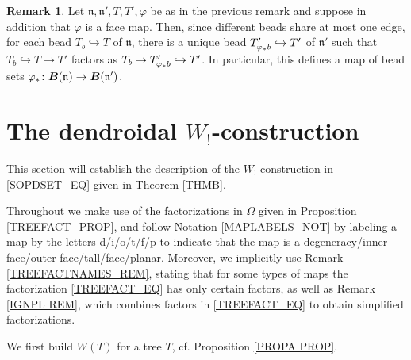 \documentclass[a4paper,10pt]{article}%
\numberwithin{equation}{section}
\numberwithin{figure}{section}
\theoremstyle{definition} %
\newtheorem{remark}[equation]{Remark}%
\begin{document}
\begin{remark}\label{BEADMAP REM}
	Let $\mathfrak{n},\mathfrak{n}',T,T',\varphi$ be as in the previous remark and suppose in addition that $\varphi$ is a face map.
%
	Then, since different beads share at most one edge,
	for each bead $T_{b} \hookrightarrow T$
	of $\mathfrak{n}$,
	there is a unique bead
	$T'_{\varphi_{\**} b} \hookrightarrow T'$
	of $\mathfrak{n}'$
	such that
	$T_b \hookrightarrow T \to T'$
	factors as
	$T_b \to T'_{\varphi_{\**}b} \hookrightarrow T'$.
%	
	In particular, 
	this defines a map of bead sets
	$\varphi_{\**} \colon 
	\boldsymbol{B}(\mathfrak{n}) \to 
	\boldsymbol{B}(\mathfrak{n}')$.
\end{remark}




\section{The dendroidal $W_!$-construction}\label{WCONS SEC}

This section will establish the description
of the $W_!$-construction in \eqref{SOPDSET_EQ}
given in Theorem \ref{THMB}.

Throughout we make  
use of the factorizations in $\Omega$ given in 
Proposition \ref{TREEFACT_PROP},
and follow Notation \ref{MAPLABELS_NOT}
by labeling a map by the letters d/i/o/t/f/p
to indicate that the map is
a degeneracy/inner face/outer face/tall/face/planar.
Moreover, we implicitly use
Remark \ref{TREEFACTNAMES_REM},
stating that for some types of maps the factorization 
\eqref{TREEFACT_EQ} has only certain factors,
as well as Remark \ref{IGNPL REM},
which combines factors in \eqref{TREEFACT_EQ}
to obtain simplified factorizations.
 
We first build $W(T)$ for a tree $T$, cf. Proposition \ref{PROPA PROP}.
\end{document}

